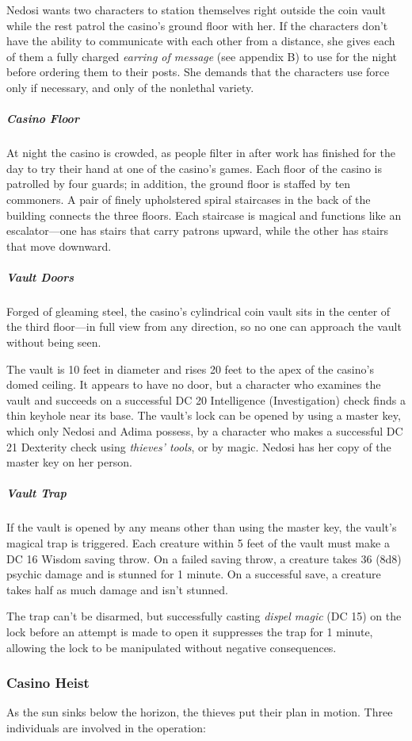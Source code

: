\documentclass[10pt,a4paper,twoside,bg=print,twocolumn,openany,nodeprecatedcode]{dndbook}
\begin{document}
Nedosi wants two characters to station themselves right outside the coin vault while the rest patrol the casino's ground floor with her. If the characters don't have the ability to communicate with each other from a distance, she gives each of them a fully charged \textit{earring of message} (see appendix B) to use for the night before ordering them to their posts. She demands that the characters use force only if necessary, and only of the nonlethal variety.

\subparagraph{Casino Floor}
At night the casino is crowded, as people filter in after work has finished for the day to try their hand at one of the casino's games. Each floor of the casino is patrolled by four guards; in addition, the ground floor is staffed by ten commoners. A pair of finely upholstered spiral staircases in the back of the building connects the three floors. Each staircase is magical and functions like an escalator—one has stairs that carry patrons upward, while the other has stairs that move downward.

\subparagraph{Vault Doors}
Forged of gleaming steel, the casino's cylindrical coin vault sits in the center of the third floor—in full view from any direction, so no one can approach the vault without being seen.

The vault is 10 feet in diameter and rises 20 feet to the apex of the casino's domed ceiling. It appears to have no door, but a character who examines the vault and succeeds on a successful DC 20 Intelligence (Investigation) check finds a thin keyhole near its base. The vault's lock can be opened by using a master key, which only Nedosi and Adima possess, by a character who makes a successful DC 21 Dexterity check using \textit{thieves' tools}, or by magic. Nedosi has her copy of the master key on her person.

\subparagraph{Vault Trap}
If the vault is opened by any means other than using the master key, the vault's magical trap is triggered. Each creature within 5 feet of the vault must make a DC 16 Wisdom saving throw. On a failed saving throw, a creature takes 36 (8d8) psychic damage and is stunned for 1 minute. On a successful save, a creature takes half as much damage and isn't stunned.

The trap can't be disarmed, but successfully casting \textit{dispel magic} (DC 15) on the lock before an attempt is made to open it suppresses the trap for 1 minute, allowing the lock to be manipulated without negative consequences.

\subsubsection{Casino Heist}
As the sun sinks below the horizon, the thieves put their plan in motion. Three individuals are involved in the operation:
\end{document}

